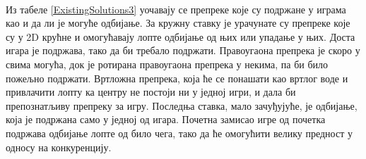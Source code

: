 \\ \indent 
Из табеле \ref{ExistingSolutions3} уочавају се препреке које су подржане у играма као и да ли је могуће одбијање. За кружну ставку је урачунате су препреке које су у 2D крућне и омогућавају лопте одбијање од њих или упадање у њих. Доста игара је подржава, тако да би требало подржати. Правоугаона препрека је скоро у свима могућа, док је ротирана правоугаона препрека у некима, па би било пожељно подржати. Вртложна препрека, која ће се понашати као вртлог воде и привлачити лопту ка центру не постоји ни у једној игри, и дала би препознатљиву препреку за игру. Последња ставка, мало зачуђујуће, је одбијање, која је подржана само у једној од игара. Почетна замисао игре од почетка подржава одбијање лопте од било чега, тако да ће омогућити велику предност у односу на конкуренцију.
